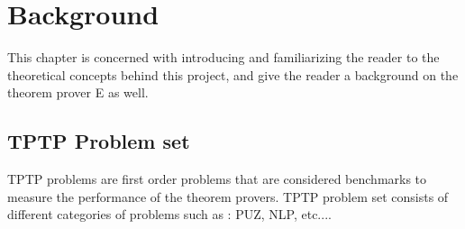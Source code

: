 \chapter{Background}\label{chap:background}

This chapter is concerned with introducing and familiarizing the reader to the theoretical concepts behind this project, and give the reader a background on the theorem prover E as well.



\section{TPTP Problem set}\label{sec:c2s2}
TPTP problems are first order problems that are considered benchmarks to measure the performance of the theorem provers. TPTP problem set consists of different categories of problems such as : PUZ, NLP, etc....



